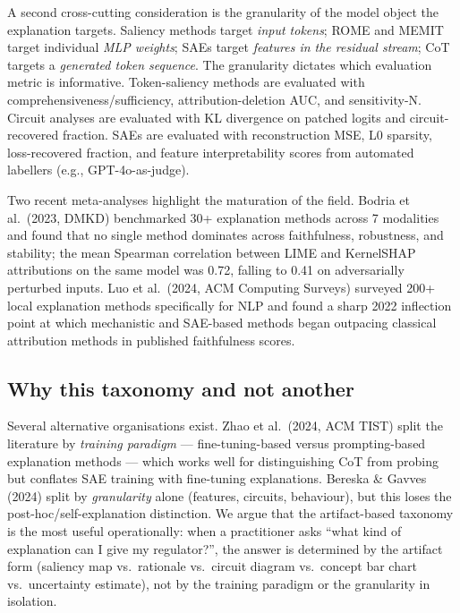 A second cross-cutting consideration is the granularity of the model object the explanation targets. Saliency methods target \emph{input tokens}; ROME and MEMIT target individual \emph{MLP weights}; SAEs target \emph{features in the residual stream}; CoT targets a \emph{generated token sequence}. The granularity dictates which evaluation metric is informative. Token-saliency methods are evaluated with comprehensiveness/sufficiency, attribution-deletion AUC, and sensitivity-N. Circuit analyses are evaluated with KL divergence on patched logits and circuit-recovered fraction. SAEs are evaluated with reconstruction MSE, L0 sparsity, loss-recovered fraction, and feature interpretability scores from automated labellers (e.g., GPT-4o-as-judge).

Two recent meta-analyses highlight the maturation of the field. Bodria et al.~(2023, DMKD) benchmarked 30+ explanation methods across 7 modalities and found that no single method dominates across faithfulness, robustness, and stability; the mean Spearman correlation between LIME and KernelSHAP attributions on the same model was 0.72, falling to 0.41 on adversarially perturbed inputs. Luo et al.~(2024, ACM Computing Surveys) surveyed 200+ local explanation methods specifically for NLP and found a sharp 2022 inflection point at which mechanistic and SAE-based methods began outpacing classical attribution methods in published faithfulness scores.

\subsection{Why this taxonomy and not another}\label{why-this-taxonomy-and-not-another}

Several alternative organisations exist. Zhao et al.~(2024, ACM TIST) split the literature by \emph{training paradigm} --- fine-tuning-based versus prompting-based explanation methods --- which works well for distinguishing CoT from probing but conflates SAE training with fine-tuning explanations. Bereska \& Gavves (2024) split by \emph{granularity} alone (features, circuits, behaviour), but this loses the post-hoc/self-explanation distinction. We argue that the artifact-based taxonomy is the most useful operationally: when a practitioner asks ``what kind of explanation can I give my regulator?'', the answer is determined by the artifact form (saliency map vs.~rationale vs.~circuit diagram vs.~concept bar chart vs.~uncertainty estimate), not by the training paradigm or the granularity in isolation.


